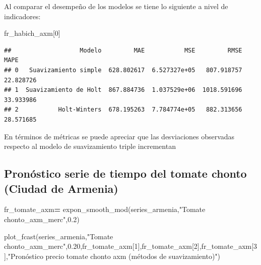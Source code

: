 \documentclass[
]{book}
\newenvironment{Shaded}{\begin{snugshade}}{\end{snugshade}}
\newcommand{\DecValTok}[1]{\textcolor[rgb]{0.00,0.00,0.81}{#1}}
\newcommand{\FloatTok}[1]{\textcolor[rgb]{0.00,0.00,0.81}{#1}}
\newcommand{\NormalTok}[1]{#1}
\newcommand{\OperatorTok}[1]{\textcolor[rgb]{0.81,0.36,0.00}{\textbf{#1}}}
\newcommand{\StringTok}[1]{\textcolor[rgb]{0.31,0.60,0.02}{#1}}
\begin{document}
Al comparar el desempeño de los modelos se tiene lo siguiente a nivel de indicadores:

\begin{Shaded}
\begin{Highlighting}[]

\NormalTok{fr\_habich\_axm[}\DecValTok{0}\NormalTok{]}
\end{Highlighting}
\end{Shaded}

\begin{verbatim}
##                   Modelo         MAE           MSE         RMSE       MAPE
## 0   Suavizamiento simple  628.802617  6.527327e+05   807.918757  22.828726
## 1  Suavizamiento de Holt  867.884736  1.037529e+06  1018.591696  33.933986
## 2           Holt-Winters  678.195263  7.784774e+05   882.313656  28.571685
\end{verbatim}

En términos de métricas se puede apreciar que las desviaciones observadas respecto al modelo de suavizamiento triple incrementan

\hypertarget{pronuxf3stico-serie-de-tiempo-del-tomate-chonto-ciudad-de-armenia}{%
\subsection{Pronóstico serie de tiempo del tomate chonto (Ciudad de Armenia)}\label{pronuxf3stico-serie-de-tiempo-del-tomate-chonto-ciudad-de-armenia}}

\begin{Shaded}
\begin{Highlighting}[]

\NormalTok{fr\_tomate\_axm}\OperatorTok{=}\NormalTok{ expon\_smooth\_mod(series\_armenia,}\StringTok{"Tomate chonto\_axm\_merc"}\NormalTok{,}\FloatTok{0.2}\NormalTok{)}

\NormalTok{plot\_fcast(series\_armenia,}\StringTok{"Tomate chonto\_axm\_merc"}\NormalTok{,}\FloatTok{0.20}\NormalTok{,fr\_tomate\_axm[}\DecValTok{1}\NormalTok{],fr\_tomate\_axm[}\DecValTok{2}\NormalTok{],fr\_tomate\_axm[}\DecValTok{3}\NormalTok{],}\StringTok{"Pronóstico precio tomate chonto axm (métodos de suavizamiento)"}\NormalTok{)}
\end{Highlighting}
\end{Shaded}
\end{document}
